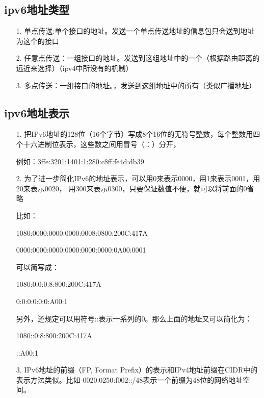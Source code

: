 \documentclass[a4paper,left=1.5cm,right=1.5cm,11pt]{article}
\begin{document}
\subsection{ipv6地址类型}
	\begin{itemize}
		\item[1.]单点传送:单个接口的地址。发送一个单点传送地址的信息包只会送到地址为这个的接口
		\item[2.]任意点传送：一组接口的地址。发送到这组地址中的一个（根据路由距离的远近来选择）（ipv4中所没有的机制）
		\item[3.]多点传送：一组接口的地址。，发送到这组地址中的所有（类似广播地址）
	\end{itemize}
\subsection{ipv6地址表示}
	\begin{itemize}
		\item[1.]把IPv6地址的128位（16个字节）写成8个16位的无符号整数，每个整数用四个十六进制位表示，这些数之间用冒号（：）分开，\par
				例如：3ffe:3201:1401:1:280:c8ff:fe4d:db39
		\item[2.]为了进一步简化IPv6的地址表示，可以用0来表示0000，用1来表示0001，用20来表示0020， 用300来表示0300，只要保证数值不便，就可以将前面的0省略\par
				比如：\par
					1080:0000:0000:0000:0008:0800:200C:417A\par
					0000:0000:0000:0000:0000:0000:0A00:0001\par
				可以简写成：\par
					1080:0:0:0:8:800:200C:417A \par
					0:0:0:0:0:0:A00:1 \par
				另外，还规定可以用符号::表示一系列的0。那么上面的地址又可以简化为：\par
					1080::0:8:800:200C:417A \par
					::A00:1 \par
		\item[3.]IPv6地址的前缀（FP, Format Prefix）的表示和IPv4地址前缀在CIDR中的表示方法类似。比如 0020:0250:f002::/48表示一个前缀为48位的网络地址空间。\par
	\end{itemize}
\end{document}
